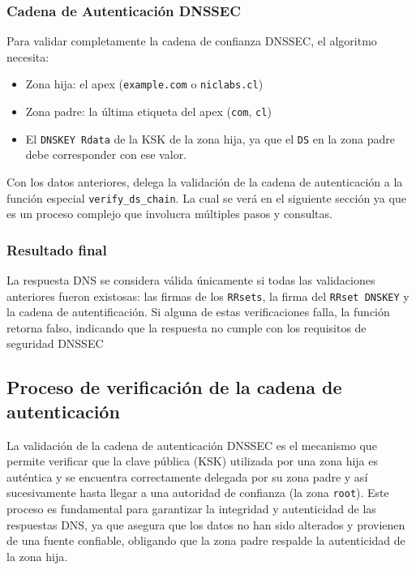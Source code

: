 \subsubsection{Cadena de Autenticación DNSSEC}

Para validar completamente la cadena de confianza DNSSEC, el algoritmo necesita:

\begin{itemize}
    \item Zona hija: el apex (\texttt{example.com} o \texttt{niclabs.cl})
    \item Zona padre: la última etiqueta del apex (\texttt{com}, \texttt{cl})
    \item El \texttt{DNSKEY Rdata} de la KSK de la zona hija, ya que el \texttt{DS} en la zona padre debe corresponder con ese valor.
\end{itemize}

Con los datos anteriores, delega la validación de la cadena de autenticación a la función especial \texttt{verify\_ds\_chain}.
La cual se verá en el siguiente sección ya que es un proceso complejo que involucra múltiples pasos y consultas.

\subsubsection{Resultado final}

La respuesta DNS se considera válida únicamente si todas las validaciones anteriores fueron existosas: las firmas de los \texttt{RRsets}, la firma del \texttt{RRset DNSKEY} y la cadena 
de autentificación. Si alguna de estas verificaciones falla, la función retorna falso, indicando que la respuesta no cumple con los requisitos de seguridad DNSSEC

\subsection{Proceso de verificación de la cadena de autenticación}

La validación de la cadena de autenticación DNSSEC es el mecanismo que permite verificar que la clave pública (KSK) utilizada por una zona hija es auténtica y se encuentra correctamente 
delegada por su zona padre y así sucesivamente hasta llegar a una autoridad de confianza (la zona \texttt{root}). Este proceso es fundamental para garantizar la integridad y autenticidad de 
las respuestas DNS, ya que asegura que los datos no han sido alterados y provienen de una fuente confiable, obligando que la zona padre respalde la autenticidad de la zona hija.

